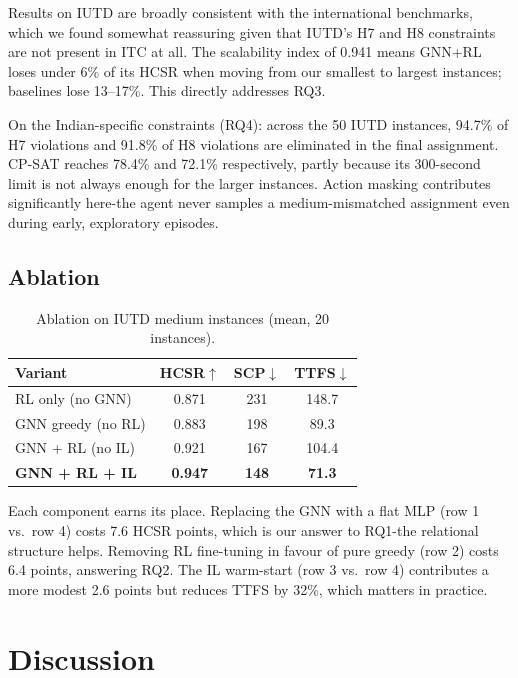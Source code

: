 \documentclass[conference]{IEEEtran}
\begin{document}
Results on IUTD are broadly consistent with the international benchmarks, which we found somewhat reassuring given that IUTD's H7 and H8 constraints are not present in ITC at all. The scalability index of 0.941 means GNN+RL loses under 6\% of its HCSR when moving from our smallest to largest instances; baselines lose 13--17\%. This directly addresses RQ3.

On the Indian-specific constraints (RQ4): across the 50 IUTD instances, 94.7\% of H7 violations and 91.8\% of H8 violations are eliminated in the final assignment. CP-SAT reaches 78.4\% and 72.1\% respectively, partly because its 300-second limit is not always enough for the larger instances. Action masking contributes significantly here-the agent never samples a medium-mismatched assignment even during early, exploratory episodes.

\subsection{Ablation}

\begin{table}[ht]
\centering
\caption{Ablation on IUTD medium instances (mean, 20 instances).}
\label{tab:ablation}
\begin{tabular}{lccc}
\toprule
\textbf{Variant} & \textbf{HCSR$\uparrow$} & \textbf{SCP$\downarrow$} & \textbf{TTFS$\downarrow$} \\
\midrule
RL only (no GNN)       & 0.871 & 231 & 148.7 \\
GNN greedy (no RL)     & 0.883 & 198 & 89.3  \\
GNN + RL (no IL)       & 0.921 & 167 & 104.4 \\
\textbf{GNN + RL + IL} & \textbf{0.947} & \textbf{148} & \textbf{71.3} \\
\bottomrule
\end{tabular}
\end{table}

Each component earns its place. Replacing the GNN with a flat MLP (row 1 vs.\ row 4) costs 7.6 HCSR points, which is our answer to RQ1-the relational structure helps. Removing RL fine-tuning in favour of pure greedy (row 2) costs 6.4 points, answering RQ2. The IL warm-start (row 3 vs.\ row 4) contributes a more modest 2.6 points but reduces TTFS by 32\%, which matters in practice.


\section{Discussion}
\label{sec:discussion}
\end{document}
